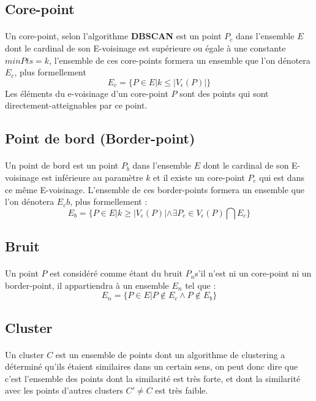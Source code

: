 	\subsection{Core-point}\label{corepoint}
		\paragraph{}
		Un core-point, selon l'algorithme \textbf{DBSCAN} est un point $P_c$ dans l'ensemble $E$ dont le cardinal de son E-voisinage est supérieure ou égale à une constante $minPts = k$, l'ensemble de ces core-points formera un ensemble que l'on dénotera $E_c$, plus formellement
			\[
				E_c = \lbrace P \in E | k \leq |V_\epsilon(P)| \rbrace
			\]
		Les éléments du e-voisinage d'un core-point $P$ sont des points qui sont directement-atteignables par ce point.
	\subsection{Point de bord (Border-point)}
		\paragraph{}
		Un point de bord est un point $P_b$ dans l'ensemble $E$ dont le cardinal de son E-voisinage est inférieure au paramètre $k$ et il existe un core-point $P_c$ qui est dans ce même E-voisinage. L'ensemble de ces border-points formera un ensemble que l'on dénotera $E_cb$, plus formellement : 
		\[
			E_b = \lbrace P \in E | k \geq |V_\epsilon(P)| \land \exists P_c \in V_\epsilon(P) \bigcap E_c \rbrace
		\] 
	\subsection{Bruit}
		\paragraph{}
		Un point $P$ est considéré comme étant du bruit $P_n$s'il n'est ni un core-point ni un border-point, il appartiendra à un ensemble $E_n$ tel que : 
		\[
			E_n = \lbrace P \in E | P \notin E_c \land P \notin E_b \rbrace
		\] 
	\subsection{Cluster}
		\paragraph{}
		Un cluster $C$ est un ensemble de points dont  un algorithme de clustering a déterminé qu'ils étaient similaires dans un certain sens, on peut donc dire que c'est l'ensemble des points dont la similarité est très forte, et dont la similarité avec les points d'autres clusters $C\prime \neq C$ est très faible.	
